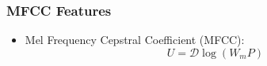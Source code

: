 \begin{frame}
  \frametitle{MFCC Features}
  \begin{itemize}
    \item Mel Frequency Cepstral Coefficient (MFCC):
    \begin{equation*}
      U = \mathcal{D} \log{ \left( W_m   P \right) }
    \end{equation*}
  \end{itemize}
  \begin{figure}
    \centering
  \end{figure}
\end{frame}

